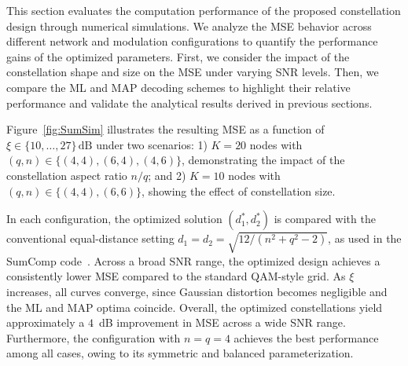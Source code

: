 \documentclass[journal,12pt,onecolumn,draftclsnofoot]{IEEEtran}
\theoremstyle{definition}
\begin{document}
This section evaluates the computation performance of the proposed constellation design through numerical simulations. 
We analyze the MSE behavior across different network and modulation configurations to quantify the performance gains of the optimized parameters.  First, we consider the impact of the constellation shape and size on the MSE under varying SNR levels. Then, we compare the ML and MAP decoding schemes to highlight their relative performance and validate the analytical results derived in previous sections.

Figure~\ref{fig:SumSim} illustrates the resulting MSE as a function of $\xi \in \{10, \dots, 27\}\,\mathrm{dB}$ under two scenarios:   1) $K = 20$ nodes with $(q, n) \in \{(4,4), (6,4), (4,6)\}$, demonstrating the impact of the constellation aspect ratio $n/q$; and   2) $K = 10$ nodes with $(q, n) \in \{(4,4), (6,6)\}$, showing the effect of constellation size.  

In each configuration, the optimized solution $(d_1^*, d_2^*)$ is compared with the conventional equal-distance setting  $d_1 = d_2 = \sqrt{12 / (n^2 + q^2 - 2)}$, 
as used in the SumComp code~\cite{Razavikia2024Ring}.  Across a broad SNR range, the optimized design achieves a consistently lower MSE compared to the standard QAM-style grid. As $\xi$ increases, all curves converge, since Gaussian distortion becomes negligible and the ML and MAP optima coincide.  Overall, the optimized constellations yield approximately a $4$~dB improvement in MSE across a wide SNR range.  Furthermore, the configuration with $n = q = 4$ achieves the best performance among all cases, owing to its symmetric and balanced parameterization.
\end{document}
